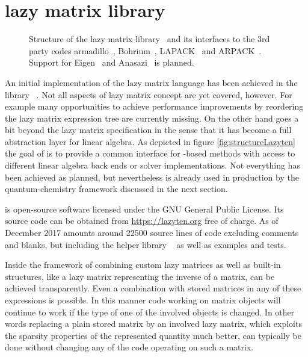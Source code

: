 \section{\lazyten lazy matrix library}
\label{sec:lazyten}
\begin{figure}
	\centering
	\caption[Structure of the \lazyten lazy matrix library]{%
		Structure of the \lazyten lazy matrix library~\cite{lazytenWeb}
		and its interfaces to the 3rd party codes
		armadillo~\cite{Armadillo}, Bohrium~\cite{Kristensen2016array,Kristensen2016streaming},
		LAPACK~\cite{LAPACK} and ARPACK~\cite{ARPACK}.
		Support for Eigen~\cite{Eigen} and Anasazi~\cite{Anasazi} is planned.
	}
	\label{fig:structureLazyten}
\end{figure}
An initial implementation of the lazy matrix language has been
achieved in the \cpp library \lazyten~\cite{lazytenWeb}.
Not all aspects of lazy matrix concept are yet covered, however.
For example many opportunities to achieve performance improvements
by reordering the lazy matrix expression tree are currently missing.
On the other hand \lazyten goes a bit beyond the lazy matrix specification
in the sense that it has become a full abstraction layer for linear algebra.
As depicted in figure \vref{fig:structureLazyten}
the goal of \lazyten is to provide a common interface
for \contraction-based methods
with access to different linear algebra back ends or solver implementations.
Not everything has been achieved as planned,
but nevertheless \lazyten is already used in production
by the \molsturm quantum-chemistry framework discussed in the next section.

\lazyten is open-source software licensed under the
GNU General Public License.
Its source code can be obtained from \url{https://lazyten.org} free of charge.
As of December 2017 \lazyten amounts around 22500 source lines of code
excluding comments and blanks,
but including the helper library \krims~\cite{krimsWeb}
as well as examples and tests.

Inside the framework of \lazyten combining custom lazy matrices
as well as built-in structures,
like a lazy matrix representing the inverse of a matrix,
can be achieved transparently.
Even a combination with stored matrices in any of these expressions is possible.
In this manner code working on \lazyten matrix objects
will continue to work if the type of one of the involved objects is changed.
In other words replacing a plain stored matrix by an involved lazy matrix,
which exploits the sparsity properties of the represented quantity
much better,
can typically be done without changing any of the code operating on such a matrix.

